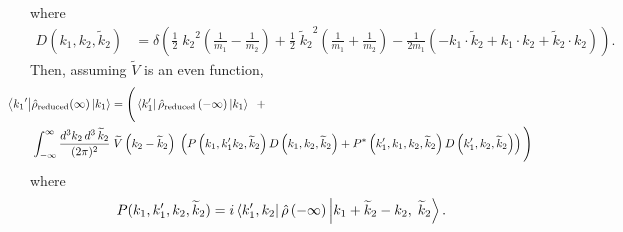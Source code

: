 where
\begin{align*}
D(k_1, k_2, \widetilde{k}_2) &= \delta\left({\textstyle \frac{1}{2}\;{{k}_2}^2\left(\frac{1}{m_1}-\frac{1}{m_2}\right)+ \frac{1}{2}\;{\widetilde{k}_2}^2\left(\frac{1}{m_1}+\frac{1}{m_2}\right) - \frac{1}{2m_1}\left(-k_1\cdot \widetilde{k}_2 + k_1 \cdot k_2 + \widetilde{k}_2 \cdot k_2\right)}\right).
\end{align*}
Then, assuming \(\widetilde{V}\) is an even function,
\begin{align}\label{eq.reddensevolution}
\hspace{-4em}\bra{{k_1}^\prime}&\op{\rho}_\text{reduced}(\infty)\ket{k_1}
= {\Bigg (}
\bra{k_1^\prime}\op{\rho}_\text{reduced}\left(-\infty\right)\ket{k_1}\;\;+
 \\&\nonumber \int_{-\infty}^\infty \frac{d^3k_2 \,d^3\,\widetilde{k}_2}{(2\pi)^2}\;\widetilde{V}\left(k_2 - 
\widetilde{k}_2\right)\;\left(P\left(k_1,k_1^\prime k_2, \widetilde{k}_2\right)D\left(k_1, k_2, \widetilde{k}_2\right) + P^*\left(k_1^\prime,k_1, k_2, \widetilde{k}_2\right)D\left(k_1^\prime, k_2, \widetilde{k}_2\right)\right){\Bigg )}
\end{align}
where
\[
P(k_1, k_1^\prime, k_2, \widetilde{k}_2) = i\left\langle k_1^\prime, k_2\right| \hat{\rho}\left(-\infty\right) \left|k_1 + \widetilde{k}_2 - k_2,\; \widetilde{k}_2\right\rangle.
\]


